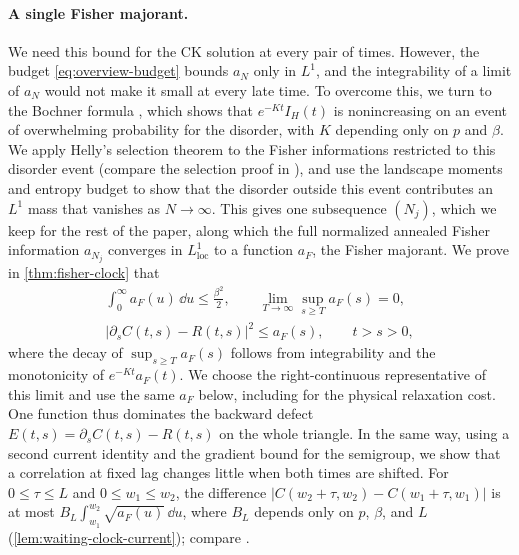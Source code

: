 \paragraph{A single Fisher majorant.}
We need this bound for the CK solution at every pair of times. However, the budget \eqref{eq:overview-budget} bounds $a_N$ only in $L^1$, and the integrability of a limit of $a_N$ would not make it small at every late time. To overcome this, we turn to the Bochner formula \cite[Proposition~3, equation~(4b), p.~187]{bakryemery1985}, which shows that $e^{-Kt}I_H(t)$ is nonincreasing on an event of overwhelming probability for the disorder, with $K$ depending only on $p$ and $\beta$. We apply Helly's selection theorem to the Fisher informations restricted to this disorder event (compare the selection proof in \cite[Theorem~25.9, p.~336]{billingsley1995}), and use the landscape moments and entropy budget to show that the disorder outside this event contributes an $L^1$ mass that vanishes as $N\to\infty$. This gives one subsequence $(N_j)$, which we keep for the rest of the paper, along which the full normalized annealed Fisher information $a_{N_j}$ converges in $L^1_{\mathrm{loc}}$ to a function $a_F$, the Fisher majorant. We prove in \cref{thm:fisher-clock} that
\begin{equation}\label{eq:overview-fisher}
\begin{gathered}
 \int_0^\infty a_F(u)\,\dd u\le\frac{\beta^2}2,\qquad
 \lim_{T\to\infty}\sup_{s\ge T}a_F(s)=0,\\
 |\partial_sC(t,s)-R(t,s)|^2\le a_F(s),\qquad t>s>0,
\end{gathered}
\end{equation}
where the decay of $\sup_{s\ge T}a_F(s)$ follows from integrability and the monotonicity of $e^{-Kt}a_F(t)$. We choose the right-continuous representative of this limit and use the same $a_F$ below, including for the physical relaxation cost. One function thus dominates the backward defect $E(t,s)=\partial_sC(t,s)-R(t,s)$ on the whole triangle. In the same way, using a second current identity and the gradient bound for the semigroup, we show that a correlation at fixed lag changes little when both times are shifted. For $0\le\tau\le L$ and $0\le w_1\le w_2$, the difference $|C(w_2+\tau,w_2)-C(w_1+\tau,w_1)|$ is at most $B_L\int_{w_1}^{w_2}\sqrt{a_F(u)}\,\dd u$, where $B_L$ depends only on $p$, $\beta$, and $L$ (\cref{lem:waiting-clock-current}); compare \cite[arXiv version~2, equation~(15), p.~3]{cdk1997}.

